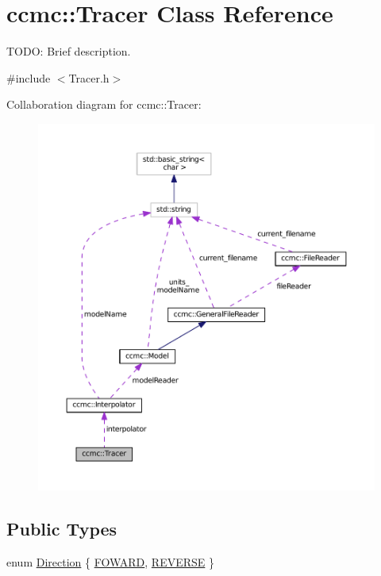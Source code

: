 \hypertarget{classccmc_1_1_tracer}{\section{ccmc\-:\-:Tracer Class Reference}
\label{classccmc_1_1_tracer}
}


T\-O\-D\-O\-: Brief description.  




{\ttfamily \#include $<$Tracer.\-h$>$}



Collaboration diagram for ccmc\-:\-:Tracer\-:
\nopagebreak
\begin{figure}[H]
\begin{center}
\leavevmode
\includegraphics[width=350pt]{classccmc_1_1_tracer__coll__graph}
\end{center}
\end{figure}
\subsection*{Public Types}
\begin{DoxyCompactItemize}
\item 
enum \hyperlink{classccmc_1_1_tracer_a2c914b28e2e205cb1a7c01f2941fcae2}{Direction} \{ \hyperlink{classccmc_1_1_tracer_a2c914b28e2e205cb1a7c01f2941fcae2a133381f1178a2affb0f1c79a67b45e52}{F\-O\-W\-A\-R\-D}, 
\hyperlink{classccmc_1_1_tracer_a2c914b28e2e205cb1a7c01f2941fcae2af2f8ce1e1224ce9d334d5260fa8a8526}{R\-E\-V\-E\-R\-S\-E}
 \}
\end{DoxyCompactItemize}
